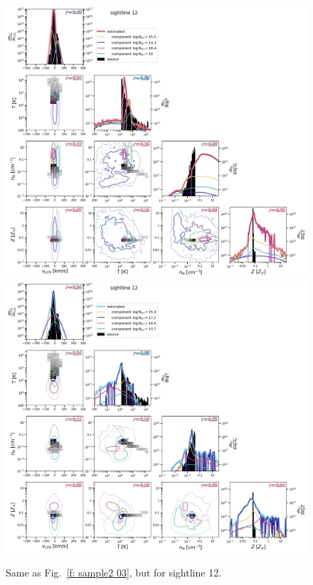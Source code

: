 \documentclass[fleqn,usenatbib]{mnras}
\begin{document}
\begin{figure}
    \centering
    \includegraphics[height=0.45\textheight]{figures/sample2/original/sightline_0012.png}
    \includegraphics[height=0.45\textheight]{figures/sample2/high-z/sightline_0012.png}
    \label{f: sample2 12 corner}
    \caption{Same as Fig.~\ref{f: sample2 03}, but for sightline 12.}
\end{figure}
\end{document}
